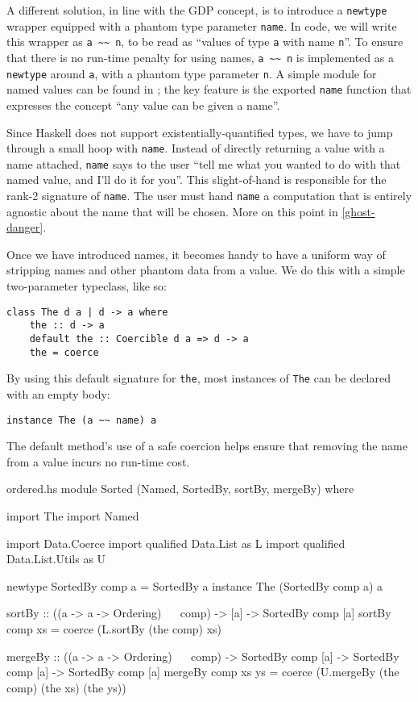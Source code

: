\documentclass[format=sigplan, review=false, screen=true]{acmart}
\begin{document}
A different solution, in line with the GDP concept, is to introduce a \texttt{newtype} wrapper equipped with
a phantom type parameter \texttt{name}.
In code, we will write this wrapper as \verb|a ~~ n|, to be read as
``values of type \texttt{a} with name \texttt{n}''. To ensure that there is no
run-time penalty for using names, \verb|a ~~ n| is implemented as a \texttt{newtype}
around \texttt{a}, with a phantom type parameter \texttt{n}. A simple module for named values
can be found in ; the key feature is the exported \texttt{name}
function that expresses the concept ``any value can be given a name''.

Since Haskell does not support existentially-quantified types, we have to jump through
a small hoop with \texttt{name}. Instead of directly returning a value with a name attached,
\texttt{name} says to the user ``tell me what you wanted to do with that named value,
and I'll do it for you''. This slight-of-hand is responsible for the rank-2
signature of \texttt{name}. The user must hand \texttt{name} a computation that is
entirely agnostic about the name that will be chosen. More on this point in \cref{ghost-danger}.

Once we have introduced names, it becomes handy to have a uniform way of stripping names
and other phantom data from a value. We do this with a simple two-parameter typeclass,
like so:
\begin{verbatim}
class The d a | d -> a where
    the :: d -> a
    default the :: Coercible d a => d -> a
    the = coerce
\end{verbatim}
By using this default signature for \texttt{the}, most instances of \texttt{The}
can be declared with an empty body:
\begin{verbatim}
instance The (a ~~ name) a
\end{verbatim}
The default method's use of a safe coercion helps ensure that removing the name from a value
incurs no run-time cost.

\begin{filecontents*}{ordered.hs}
module Sorted (Named, SortedBy, sortBy, mergeBy) where   

import The
import Named

import           Data.Coerce
import qualified Data.List       as L
import qualified Data.List.Utils as U

newtype SortedBy comp a = SortedBy a
instance The (SortedBy comp a) a
  
sortBy :: ((a -> a -> Ordering) ~~ comp)
       -> [a]
       -> SortedBy comp [a]
sortBy comp xs = coerce (L.sortBy (the comp) xs)

mergeBy :: ((a -> a -> Ordering) ~~ comp)
        -> SortedBy comp [a]
        -> SortedBy comp [a]
        -> SortedBy comp [a]
mergeBy comp xs ys =
  coerce (U.mergeBy (the comp) (the xs) (the ys))        
\end{filecontents*}
\end{document}
